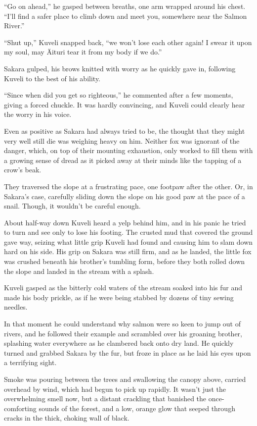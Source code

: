 ``Go on ahead,'' he gasped between breaths, one arm wrapped around his chest. ``I'll find a safer place to climb down and meet you, somewhere near the Salmon River.''

``Shut up,'' Kuveli snapped back, ``we won't lose each other again! I swear it upon my soul, may Äituri tear it from my body if we do.''

Sakara gulped, his brows knitted with worry as he quickly gave in, following Kuveli to the best of his ability.

``Since when did you get so righteous,'' he commented after a few moments, giving a forced chuckle. It was hardly convincing, and Kuveli could clearly hear the worry in his voice.

Even as positive as Sakara had always tried to be, the thought that they might very well still die was weighing heavy on him. Neither fox was ignorant of the danger, which, on top of their mounting exhaustion, only worked to fill them with a growing sense of dread as it picked away at their minds like the tapping of a crow's beak.

They traversed the slope at a frustrating pace, one footpaw after the other. Or, in Sakara's case, carefully sliding down the slope on his good paw at the pace of a snail. Though, it wouldn't be careful enough.

About half-way down Kuveli heard a yelp behind him, and in his panic he tried to turn and see only to lose his footing. The crusted mud that covered the ground gave way, seizing what little grip Kuveli had found and causing him to slam down hard on his side. His grip on Sakara was still firm, and as he landed, the little fox was crushed beneath his brother's tumbling form, before they both rolled down the slope and landed in the stream with a splash.

Kuveli gasped as the bitterly cold waters of the stream soaked into his fur and made his body prickle, as if he were being stabbed by dozens of tiny sewing needles.

In that moment he could understand why salmon were so keen to jump out of rivers, and he followed their example and scrambled over his groaning brother, splashing water everywhere as he clambered back onto dry land. He quickly turned and grabbed Sakara by the fur, but froze in place as he laid his eyes upon a terrifying sight.

Smoke was pouring between the trees and swallowing the canopy above, carried overhead by wind, which had begun to pick up rapidly. It wasn't just the overwhelming smell now, but a distant crackling that banished the once-comforting sounds of the forest, and a low, orange glow that seeped through cracks in the thick, choking wall of black.

